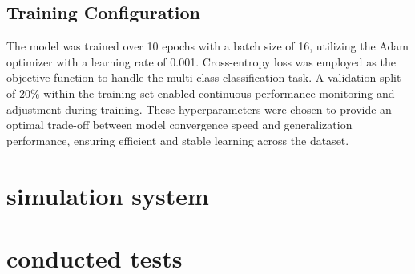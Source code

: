 \subsection{Training Configuration}

The model was trained over 10 epochs with a batch size of 16, utilizing the Adam optimizer with a learning rate of 0.001. Cross-entropy loss was employed as the objective function to handle the multi-class classification task. A validation split of 20\% within the training set enabled continuous performance monitoring and adjustment during training. These hyperparameters were chosen to provide an optimal trade-off between model convergence speed and generalization performance, ensuring efficient and stable learning across the dataset.

\section{simulation system}
\section{conducted tests}








